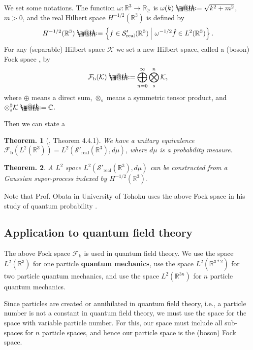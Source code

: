 \documentclass[openany, a4paper, oneside]{jsbook}
\makeatletter
\newcommand*{\defeq}{\mathrel{\rlap{%
\raisebox{0.3ex}{$\m@th\cdot$}}%
\raisebox{-0.3ex}{$\m@th\cdot$}}%
=}
\theoremstyle{break}
\newtheorem{thm}{Theorem.}[section]
\theoremstyle{breakdefn}
\newcommand{\relmiddle}[1]{\mathrel{}\middle#1\mathrel{}}
\newcommand{\set}[2]{\left\{#1 \relmiddle| #2\right\}}
\newcommand{\calFb}{\mathcal{F}_{\mathrm{b}}}
\newcommand{\calK}{\mathcal{K}}
\newcommand{\realtempereddist}{\mathcal{S}'_{\mathrm{real}}}
\makeatother
\begin{document}
We set some notations.
The function $\omega \colon \mathbb{R}^3 \to \mathbb{R}_{\geq}$ is $\omega (k) \defeq \sqrt{k^2 + m^2}$, $m > 0$,
and the real Hilbert space $H^{-1/2} (\mathbb{R}^3)$ is defined by
\begin{align}
 H^{-1/2} (\mathbb{R}^3)
 \defeq
 \set{f \in \realtempereddist (\mathbb{R}^3)}{\omega^{-1/2} \hat{f} \in L^2 (\mathbb{R}^3)}.
\end{align}
For any (separable) Hilbert space $\calK$ we set a new Hilbert space, called a (boson) Fock space \cite{AsaoArai1, AsaoArai2}, by
\begin{align}
 \calFb (\calK)
 \defeq
 \bigoplus_{n=0}^{\infty} \bigotimes_{\mathrm{s}}^n \calK,
\end{align}
where $\oplus$ means a direct sum, $\otimes_{\mathrm{s}}$ means a symmetric tensor product,
and  $\otimes_{\mathrm{s}}^0 \calK \defeq \mathbb{C}$.

Then we can state a
\begin{thm}[\cite{AraiEzawa3}, Theorem 4.4.1]
 We have a unitary equivalence $\calFb (L^2 (\mathbb{R}^3)) = L^2 (\realtempereddist (\mathbb{R}^3), d \mu)$,
 where $d \mu$ is a probability measure.
\end{thm}
\begin{thm}
 A $L^2$ space $L^2 (\realtempereddist (\mathbb{R}^3), d \mu)$ can be constructed from a Gaussian super-process indexed by $H^{-1/2} (\mathbb{R}^3)$.
\end{thm}

Note that Prof. Obata in University of Tohoku uses the above Fock space in his study of quantum probability \cite{AccardiObata1}.
\subsection{Application to quantum field theory \cite{AsaoArai1, AsaoArai2}}


The above Fock space $\calFb$ is used in quantum field theory.
We use the space $L^2 (\mathbb{R}^3)$ for one particle \textbf{quantum mechanics},
use the space $L^2 (\mathbb{R}^{3*2})$ for two particle quantum mechanics,
and use the space $L^2 (\mathbb{R}^{3n})$ for $n$ particle quantum mechanics.

Since particles are created or annihilated in quantum field theory, i.e.,
a particle number is not a constant in quantum field theory,
we must use the space for the space with variable particle number.
For this, our space must include all sub-spaces for $n$ particle spaces,
and hence our particle space is the (boson) Fock space.
\end{document}
